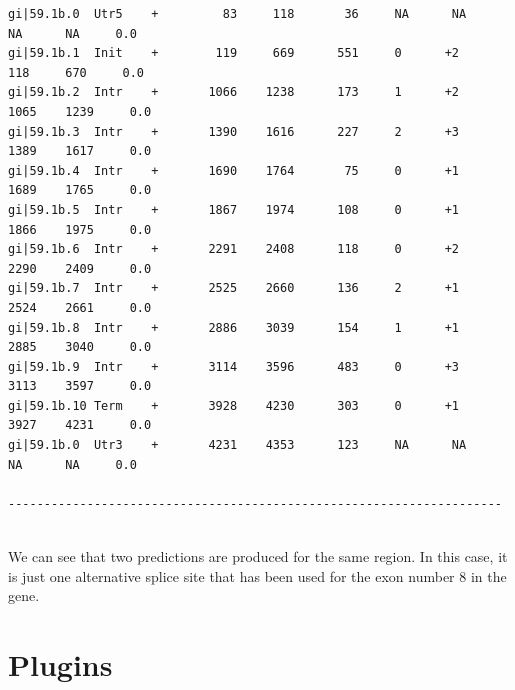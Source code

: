 \documentclass[a4paper,titlepage]{report}
\begin{document}
\begin{Verbatim}[fontsize=\scriptsize]
gi|59.1b.0	Utr5    +         83     118       36     NA      NA      NA      NA     0.0  
gi|59.1b.1	Init    +        119     669      551     0      +2     118     670     0.0  
gi|59.1b.2	Intr    +       1066    1238      173     1      +2    1065    1239     0.0  
gi|59.1b.3	Intr    +       1390    1616      227     2      +3    1389    1617     0.0  
gi|59.1b.4	Intr    +       1690    1764       75     0      +1    1689    1765     0.0  
gi|59.1b.5	Intr    +       1867    1974      108     0      +1    1866    1975     0.0  
gi|59.1b.6	Intr    +       2291    2408      118     0      +2    2290    2409     0.0  
gi|59.1b.7	Intr    +       2525    2660      136     2      +1    2524    2661     0.0  
gi|59.1b.8	Intr    +       2886    3039      154     1      +1    2885    3040     0.0  
gi|59.1b.9	Intr    +       3114    3596      483     0      +3    3113    3597     0.0  
gi|59.1b.10	Term    +       3928    4230      303     0      +1    3927    4231     0.0  
gi|59.1b.0	Utr3    +       4231    4353      123     NA      NA      NA      NA     0.0  

---------------------------------------------------------------------
 
\end{Verbatim}

We can see that two predictions are produced for the same region. In this case, it is just one alternative splice site
that has been used for the exon number 8 in the gene.

\section{Plugins}
\label{plug}
\end{document}
